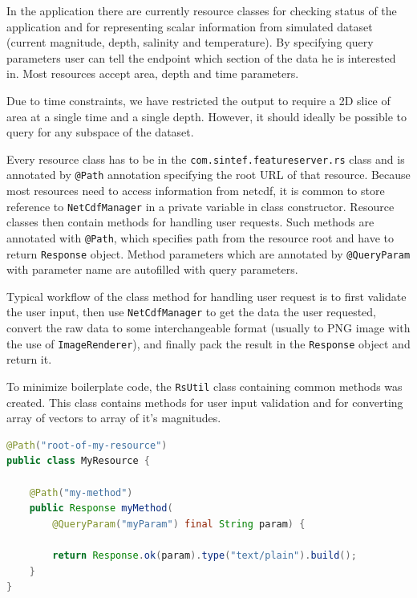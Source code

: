 \documentclass[11pt,a4paper,titlepage,oneside]{report}
\begin{document}
In the application there are currently resource classes for checking status of the application and for representing scalar information from simulated dataset (current magnitude, depth, salinity and temperature). By specifying query parameters user can tell the endpoint which section of the data he is interested in. Most resources accept area, depth and time parameters.

Due to time constraints, we have restricted the output to require a 2D slice of area at a single time and a single depth. However, it should ideally be possible to query for any subspace of the dataset.

Every resource class has to be in the \texttt{com.sintef.featureserver.rs} class and is annotated by \texttt{@Path} annotation specifying the root \gls{URL} of that resource. Because most resources need to access information from \gls{netcdf}, it is common to store reference to \texttt{NetCdfManager} in a private variable in class constructor. Resource classes then contain methods for handling user requests. Such methods are annotated with \texttt{@Path}, which specifies path from the resource root and have to return \texttt{Response} object. Method parameters which are annotated by \texttt{@QueryParam} with parameter name are autofilled with query parameters.

Typical workflow of the class method for handling user request is to first validate the user input, then use \texttt{NetCdfManager} to get the data the user requested, convert the raw data to some interchangeable format (usually to \gls{PNG} image with the use of \texttt{ImageRenderer}), and finally pack the result in the \texttt{Response} object and return it.

To minimize boilerplate code, the \texttt{RsUtil} class containing common methods was created. This class contains methods for user input validation and for converting array of vectors to array of it's magnitudes.

\begin{minipage}{\linewidth}
\begin{lstlisting}[language=Java, caption=Example of a simple REST resource class, label=lst:resourceClass, frame=single]
@Path("root-of-my-resource")
public class MyResource {
    
    @Path("my-method")
    public Response myMethod(
        @QueryParam("myParam") final String param) {
        
        return Response.ok(param).type("text/plain").build();
    }
}
\end{lstlisting}
\end{minipage}
\end{document}
